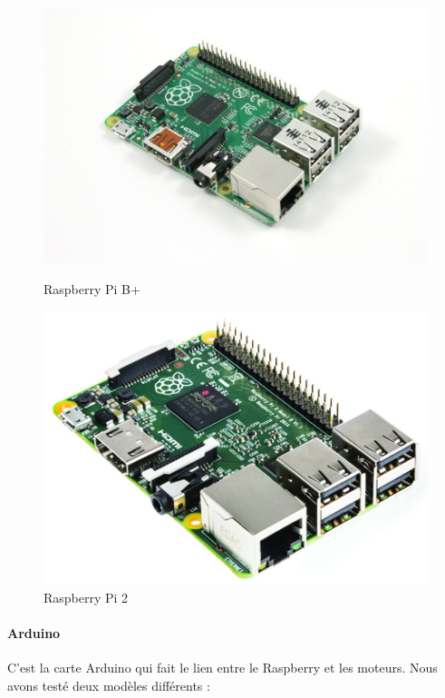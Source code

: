 \documentclass[12pt,a4paper]{report}
\begin{document}
\begin{figure}[htbp]
\begin{minipage}[c]{.45\linewidth}
\begin{center}
\includegraphics[scale=0.2]{images/modelB+.jpg}
\caption{Raspberry Pi B+}
\end{center}
\end{minipage}
\hfill
\begin{minipage}[c]{.45\linewidth}
\begin{center}
\includegraphics[scale=0.4]{images/model2.jpg}
\caption{Raspberry Pi 2}
\end{center}
\end{minipage}
\end{figure}

\paragraph{Arduino} C'est la carte Arduino qui fait le lien entre le Raspberry et les moteurs. Nous avons testé deux modèles différents :
\end{document}
